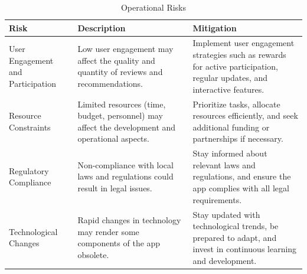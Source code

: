 \documentclass[12pt, a4paper, oneside]{article}
\begin{document}
\begin{table}[H]
\centering
\caption{Operational Risks}
\begin{tabularx}{\textwidth}{|p{}|X|X|}
\hline
\textbf{Risk} & \textbf{Description} & \textbf{Mitigation} \\
\hline
User Engagement and Participation & Low user engagement may affect the quality and quantity of reviews and recommendations. & Implement user engagement strategies such as rewards for active participation, regular updates, and interactive features. \\
\hline
Resource Constraints & Limited resources (time, budget, personnel) may affect the development and operational aspects. & Prioritize tasks, allocate resources efficiently, and seek additional funding or partnerships if necessary. \\
\hline
Regulatory Compliance & Non-compliance with local laws and regulations could result in legal issues. & Stay informed about relevant laws and regulations, and ensure the app complies with all legal requirements. \\
\hline
Technological Changes & Rapid changes in technology may render some components of the app obsolete. & Stay updated with technological trends, be prepared to adapt, and invest in continuous learning and development. \\
\hline
\end{tabularx}
\label{tab:operational-risks}
\end{table}
\pagebreak





\end{document}
